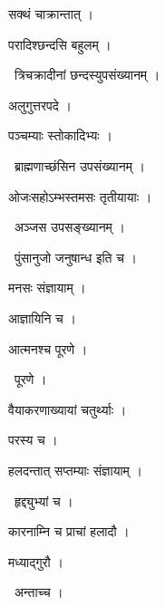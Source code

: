 \documentclass[10pt, openany, oneside]{book}
\begin{document}
\noindent सक्थं चाक्रान्तात् ।

\noindent परादिश्छन्दसि बहुलम् ।

\par\noindent\hspace{1.5em}{\vps वा॰}~{\qt त्रिचक्रादीनां छन्दस्युपसंख्यानम् ।}

\noindent अलुगुत्तरपदे ।

\noindent पञ्चम्याः स्तोकादिभ्यः ।

\par\noindent\hspace{1.5em}{\vps वा॰}~{\qt ब्राह्मणाच्छंसिन उपसंख्यानम् ।}

\noindent ओजःसहोऽम्भस्तमसः तृतीयायाः ।

\par\noindent\hspace{1.5em}{\vps वा॰}~{\qt अञ्जस उपसङ्ख्यानम् ।}

\par\noindent\hspace{1.5em}{\vps वा॰}~{\qt पुंसानुजो जनुषान्ध इति च ।}

\noindent मनसः संज्ञायाम् ।

\noindent आज्ञायिनि च ।

\noindent आत्मनश्च पूरणे ।

\par\noindent\hspace{1.5em}{\vps वा॰}~{\qt पूरणे ।}

\noindent वैयाकरणाख्यायां चतुर्थ्याः ।

\noindent परस्य च ।

\noindent हलदन्तात् सप्तम्याः संज्ञायाम् ।

\par\noindent\hspace{1.5em}{\vps वा॰}~{\qt हृद्द्युभ्यां च ।}

\noindent कारनाम्नि च प्राचां हलादौ ।

\noindent मध्याद्गुरौ ।

\par\noindent\hspace{1.5em}{\vps वा॰}~{\qt अन्ताच्च ।}
\end{document}
